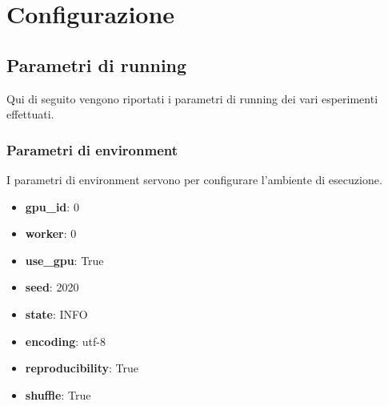 \section{Configurazione}

\subsection{Parametri di running}
Qui di seguito vengono riportati i parametri di running dei vari esperimenti effettuati.
\subsubsection*{Parametri di environment}
I parametri di environment servono per configurare l'ambiente di esecuzione.
\begin{itemize}
    \item \textbf{gpu\_id}: 0
    \item \textbf{worker}: 0
    \item \textbf{use\_gpu}: True
    \item \textbf{seed}: 2020
    \item \textbf{state}: INFO
    \item \textbf{encoding}: utf-8
    \item \textbf{reproducibility}: True
    \item \textbf{shuffle}: True
\end{itemize}

